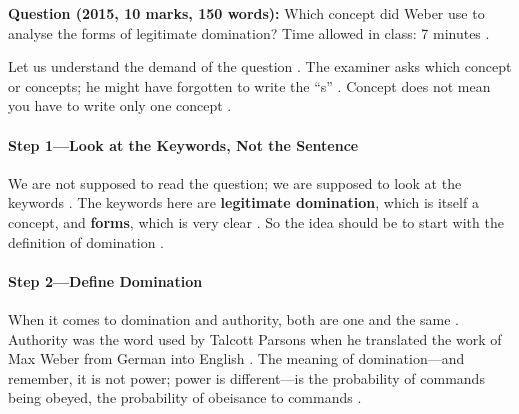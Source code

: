 \begin{PYQLink}
\textbf{Question (2015, 10 marks, 150 words):} Which concept did Weber use to analyse the forms of legitimate domination? Time allowed in class: 7 minutes .
\end{PYQLink}

Let us understand the demand of the question . The examiner asks which concept or concepts; he might have forgotten to write the ``s'' . Concept does not mean you have to write only one concept .

\paragraph{Step 1---Look at the Keywords, Not the Sentence}
We are not supposed to read the question; we are supposed to look at the keywords .
The keywords here are \textbf{legitimate domination}, which is itself a concept, and \textbf{forms}, which is very clear .
So the idea should be to start with the definition of domination .

\paragraph{Step 2---Define Domination}
\begin{KeyConcept}
When it comes to domination and authority, both are one and the same . Authority was the word used by Talcott Parsons when he translated the work of Max Weber from German into English .
The meaning of domination---and remember, it is not power; power is different---is the probability of commands being obeyed, the probability of obeisance to commands .
\end{KeyConcept}

